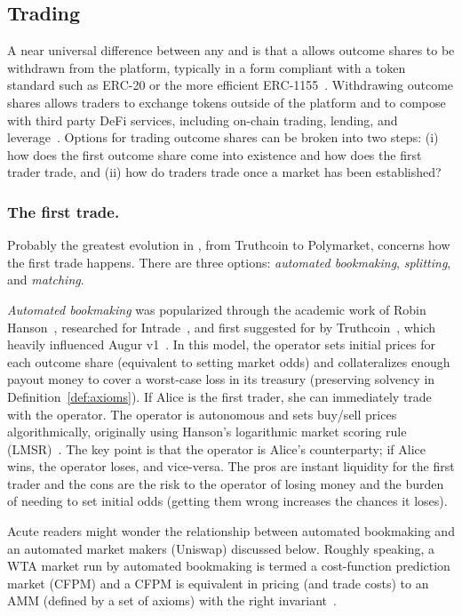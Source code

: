 \subsection{Trading}\label{wf:trade}

A near universal difference between any \cepm and \depm is that a \depm allows outcome shares to be withdrawn from the platform, typically in a form compliant with a token standard such as ERC-20 or the more efficient ERC-1155~\cite{LDBR24}. Withdrawing outcome shares allows traders to exchange tokens outside of the platform and to compose with third party DeFi services, including on-chain trading, lending, and leverage~\cite{WPG+22}. Options for trading outcome shares can be broken into two steps: (i) how does the first outcome share come into existence and how does the first trader trade, and (ii) how do traders trade once a market has been established? 

\subsubsection{The first trade.} Probably the greatest evolution in \depms, from Truthcoin to Polymarket, concerns how the first trade happens. There are three options: \textit{automated bookmaking}, \textit{splitting}, and \textit{matching}. 

\textit{Automated bookmaking} was popularized through the academic work of Robin Hanson~\cite{Ha03,Han07b}, researched for Intrade~\cite{McC08}, and first suggested for \depms by Truthcoin~\cite{Sz14}, which heavily influenced Augur v1~\cite{AKPWZ15}. In this model, the operator sets initial prices for each outcome share (equivalent to setting market odds) and collateralizes enough payout money to cover a worst-case loss in its treasury (preserving solvency in Definition~\ref{def:axioms}). If Alice is the first trader, she can immediately trade with the operator. The operator is autonomous and sets buy/sell prices algorithmically, originally using Hanson's logarithmic market scoring rule (LMSR)~\cite{Han07b}. The key point is that the operator is Alice's counterparty; if Alice wins, the operator loses, and vice-versa. The pros are instant liquidity for the first trader and the cons are the risk to the operator of losing money and the burden of needing to set initial odds (getting them wrong increases the chances it loses). 

Acute readers might wonder the relationship between automated bookmaking and  an automated market makers (\eg Uniswap) discussed below. Roughly speaking, a WTA market run by automated bookmaking is termed a cost-function prediction market (CFPM) and a CFPM is equivalent in pricing (and trade costs) to an AMM (defined by a set of axioms) with the right invariant~\cite{FPW23}.

